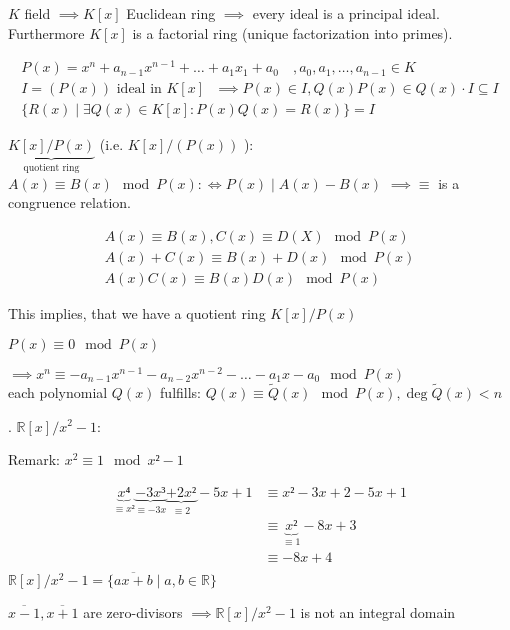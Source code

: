 $K$ field $\implies K[x]$ Euclidean ring $\implies$ every ideal is a principal ideal. Furthermore $K[x]$ is a factorial ring (unique factorization into primes).

\begin{align*}
  P(x)= x^n + a_{n-1} x^{n-1} + \ldots + a_1 x_1 + a_0 \quad ,a_0, a_1, \ldots ,a_{n-1} \in K \\
  I = (P(x)) \text{ ideal in $K[x]$ } \implies P(x) \in I, Q(x)P(x) \in Q(x) \cdot I \subseteq I \\
  \{R(x) \mid \exists Q(x) \in K[x] : P(x)Q(x) = R(x)\} = I
\end{align*}

$\underbrace{K[x]/ P(x)}_{\text{quotient ring}}$ (i.e. $K[x] / (P(x))$ ): $A(x) \equiv B(x) \mod P(x) :\Leftrightarrow P(x) ∣ A(x) - B(x)$ $\implies \equiv $ is a congruence relation.

\begin{align*}
  A(x) \equiv B(x), C(x) \equiv D(X) \mod P(x) \\
  A(x) + C(x) \equiv B(x) + D(x) \mod P(x) \\
  A(x)C(x) \equiv B(x) D(x) \mod P(x)
\end{align*}

This implies, that we have a quotient ring $K[x]/ P(x)$

$P(x) \equiv 0 \mod P(x)$

$\implies x^n \equiv -a_{n-1}x^{n-1} - a_{n-2}x^{n-2} - \ldots - a_1 x - a_0 \mod P(x)$\\
each polynomial $Q(x)$ fulfills:
$Q(x) \equiv \tilde{Q}(x) \mod P(x), \deg \tilde{Q}(x)<n$

\Example.
$\mathbb{R}[x] / x^2-1$:
\begin{leftbar}
  Remark: $x^2 \equiv 1 \mod {x² -1}$
\end{leftbar}\vspace{-1cm}
\begin{align*}
  \underbrace{x⁴}_{\equiv x²}
  \underbrace{-3x³}_{\equiv -3x}
  \underbrace{+2x²}_{\equiv 2}
  -5x + 1                       & \equiv x² - 3x +2 - 5x + 1\\
                                & \equiv \underbrace{x²}_{\equiv 1} - 8x + 3\\
                                & \equiv -8x + 4\\
\end{align*}
$\mathbb{R}[x] / x^2 -1 = \{ \overline{ax+b} \mid a,b \in \mathbb{R} \}$

$\overline{x-1}, \overline{x+1}$ are zero-divisors $\implies \mathbb{R}[x] / x^2 -1$ is not an integral domain

